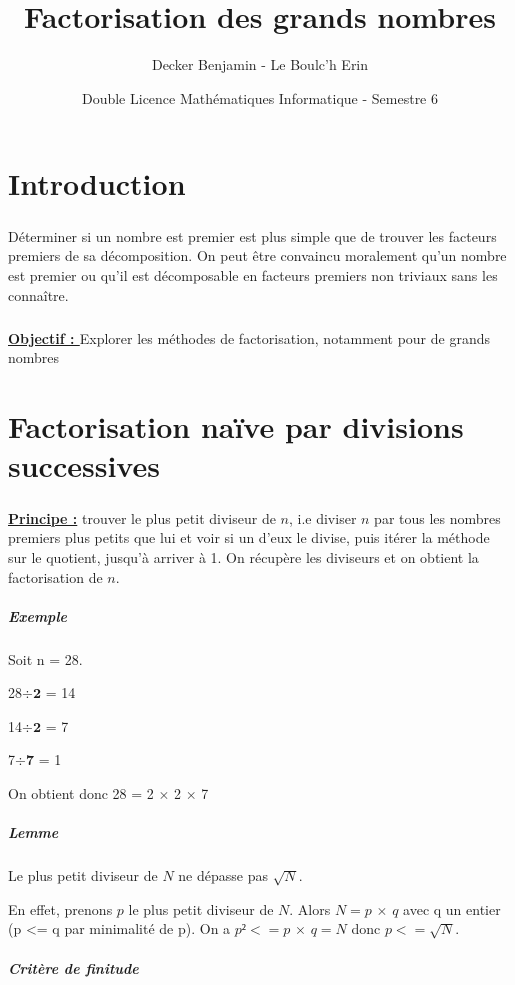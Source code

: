 \documentclass[11pt,a4paper]{article}
\begin{document}
	
	\title{Factorisation des grands nombres} 
	\author{Decker Benjamin - Le Boulc'h Erin}
	\date{Double Licence Mathématiques Informatique - Semestre 6}
	\maketitle
	\newpage
	
	\renewcommand*\contentsname{Sommaire}
	\tableofcontents
	
	\section{\LARGE{Introduction}}
	\subparagraph{}
	Déterminer si un nombre est premier est plus simple que de trouver les facteurs premiers de sa décomposition. On peut être convaincu moralement qu’un nombre est premier ou qu’il est décomposable en facteurs premiers non triviaux sans les connaître. 
	
	\subparagraph{}
	\textbf{\underline{Objectif : }}Explorer les méthodes de factorisation, notamment pour de grands nombres
	
	\section{\LARGE{Factorisation naïve par divisions successives}}
	\subparagraph{}
	\textbf{\underline{Principe :}} trouver le plus petit diviseur de  $\mathit{n}$, i.e diviser  $\mathit{n}$ par tous les nombres premiers plus petits que lui et voir si un d’eux le divise, puis itérer la méthode sur le quotient, jusqu'à arriver à 1. On récupère les diviseurs et on obtient la factorisation de $\mathit{n}$.
	
	\subparagraph{Exemple}
	Soit n = 28.
	
	28$\div$$\mathbf{2}$ = 14
	
	14$\div$$\mathbf{2}$ = 7
	
	7$\div$$\mathbf{7}$ = 1
	
	On obtient donc 28 = 2 $\times$ 2 $\times$ 7
	
	\subparagraph{Lemme}
	
	Le plus petit diviseur de $\mathit{N}$ ne dépasse pas $\sqrt{N}$.
	
	En effet, prenons $p$ le plus petit diviseur de $\mathit{N}$. Alors $\mathit{N = p}$ $\times$ $\mathit{q}$  avec q un entier (p <= q par minimalité de p). On a $\mathit{p² <= p}$ $\times$ $\mathit{q = N}$ donc $\mathit{p <= }$$\sqrt{N}$. 
	
	\subparagraph{Critère de finitude}	
	
\end{document}
